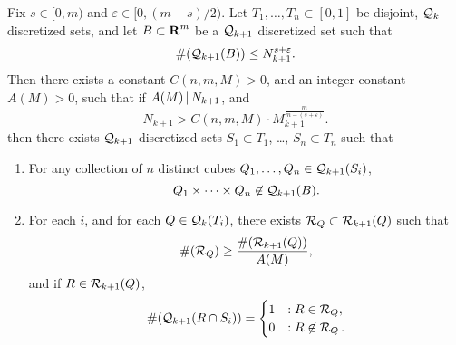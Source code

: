 \begin{theorem} \label{theorem059891891829}
    Fix $s \in [0,m)$ and $\varepsilon \in [0, (m-s)/2)$. Let $T_1, \dots, T_n \subset [0,1]$ be disjoint, $\operatorname{\mathcal{Q}}_k$ discretized sets, and let $B \subset \operatorname{\mathbf{R}}^m$ be a $\operatorname{\mathcal{Q}}_{k+1}$ discretized set such that
    \begin{equation} \label{equation6091904232093}
        \#(\operatorname{\mathcal{Q}}_{k+1}(B)) \leq N_{k+1}^{s + \varepsilon}.
    \end{equation}
    Then there exists a constant $C(n,m,M) > 0$, and an integer constant $A(M) > 0$, such that if $A(M) \operatorname{\mid} N_{k+1}$, and 
    \begin{equation} \label{equation19024u1298352389}
        N_{k+1} > C(n,m,M) \cdot M_{k+1}^{\frac{m}{m - (s + \varepsilon)}}.
    \end{equation}
    then there exists $\operatorname{\mathcal{Q}}_{k+1}$ discretized sets $S_1 \subset T_1$, \dots, $S_n \subset T_n$ such that
    \begin{enumerate}
        \item For any collection of $n$ distinct cubes $Q_1, \dots, Q_n \in \operatorname{\mathcal{Q}}_{k+1}(S_i)$,
        \[ Q_1 \times \dots \times Q_n \not \in \operatorname{\mathcal{Q}}_{k+1}(B). \]

        \item For each $i$, and for each $Q \in \operatorname{\mathcal{Q}}_k(T_i)$, there exists $\operatorname{\mathcal{R}}_Q \subset \operatorname{\mathcal{R}}_{k+1}(Q)$ such that
        \[ \#(\operatorname{\mathcal{R}}_Q) \geq \frac{\#(\operatorname{\mathcal{R}}_{k+1}(Q))}{A(M)}, \]
        and if $R \in \operatorname{\mathcal{R}}_{k+1}(Q)$,
        \[ \#(\operatorname{\mathcal{Q}}_{k+1}(R \cap S_i)) = \begin{cases} 1 &: R \in \operatorname{\mathcal{R}}_Q, \\ 0 &: R \not \in \operatorname{\mathcal{R}}_Q. \end{cases} \]
    \end{enumerate}
\end{theorem}
